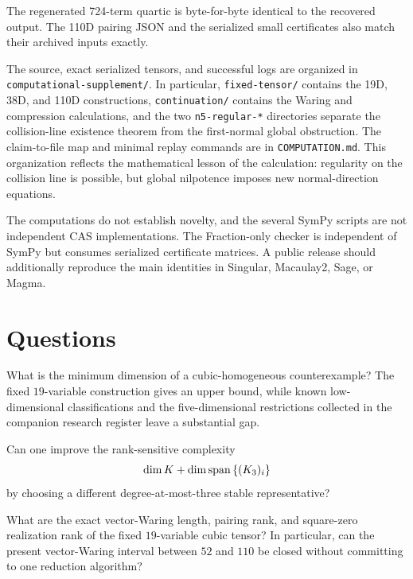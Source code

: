 \documentclass[11pt,reqno]{amsart}
\begin{document}
The regenerated 724-term quartic is byte-for-byte identical to the recovered
output.  The 110D pairing JSON and the serialized small certificates also
match their archived inputs exactly.

The source, exact serialized tensors, and successful logs are organized in
\texttt{computational-supplement/}.  In particular,
\texttt{fixed-tensor/} contains the 19D, 38D, and 110D constructions,
\texttt{continuation/} contains the Waring and compression calculations, and
the two \texttt{n5-regular-*} directories separate the collision-line
existence theorem from the first-normal global obstruction.  The
claim-to-file map and minimal replay commands are in
\texttt{COMPUTATION.md}.  This organization reflects the mathematical
lesson of the calculation: regularity on the collision line is possible,
but global nilpotence imposes new normal-direction equations.

The computations do not establish novelty, and the several SymPy scripts are
not independent CAS implementations.  The Fraction-only checker is
independent of SymPy but consumes serialized certificate matrices.  A public
release should additionally reproduce the main identities in Singular,
Macaulay2, Sage, or Magma.

\section{Questions}
\label{sec:questions}

\begin{question}
\label{q:min-homogeneous-dimension}
What is the minimum dimension of a cubic-homogeneous counterexample?  The
fixed \(19\)-variable construction gives an upper bound, while known
low-dimensional classifications and the five-dimensional restrictions
collected in the companion research register leave a substantial gap.
\end{question}

\begin{question}
Can one improve the rank-sensitive complexity
\[
\dim K+\dim\operatorname{span}\left\{(K_3)_i\right\}
\]
by choosing a different degree-at-most-three stable representative?
\end{question}

\begin{question}
\label{q:intrinsic-ranks}
What are the exact vector-Waring length, pairing rank, and square-zero
realization rank of the fixed \(19\)-variable cubic tensor?  In particular,
can the present vector-Waring interval between \(52\) and \(110\) be closed
without committing to one reduction algorithm?
\end{question}
\end{document}
